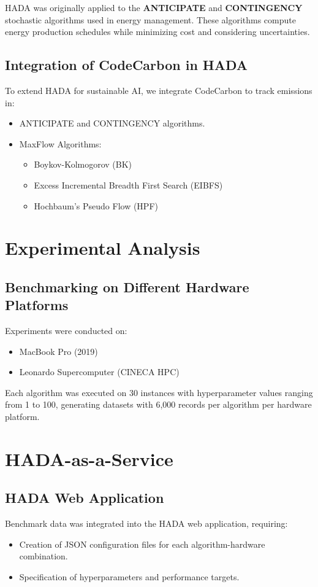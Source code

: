\documentclass[a4paper,singleside,12pt]{report} %
\begin{document}
HADA was originally applied to the \textbf{ANTICIPATE} and \textbf{CONTINGENCY} stochastic algorithms used in energy 
management. These algorithms compute energy production schedules while minimizing cost and considering uncertainties.

\section{Integration of CodeCarbon in HADA}

To extend HADA for sustainable AI, we integrate CodeCarbon to track emissions in:
\begin{itemize}
\item ANTICIPATE and CONTINGENCY algorithms.
\item MaxFlow Algorithms:
\begin{itemize}
\item Boykov-Kolmogorov (BK)
\item Excess Incremental Breadth First Search (EIBFS)
\item Hochbaum's Pseudo Flow (HPF)
\end{itemize}
\end{itemize}

\chapter{Experimental Analysis}

\section{Benchmarking on Different Hardware Platforms}
Experiments were conducted on:
\begin{itemize}
\item MacBook Pro (2019)
\item Leonardo Supercomputer (CINECA HPC)
\end{itemize}

Each algorithm was executed on 30 instances with hyperparameter values ranging from 1 to 100, 
generating datasets with 6,000 records per algorithm per hardware platform.

\chapter{HADA-as-a-Service}

\section{HADA Web Application}
Benchmark data was integrated into the HADA web application, requiring:
\begin{itemize}
\item Creation of JSON configuration files for each algorithm-hardware combination.
\item Specification of hyperparameters and performance targets.
\end{itemize}
\end{document}
